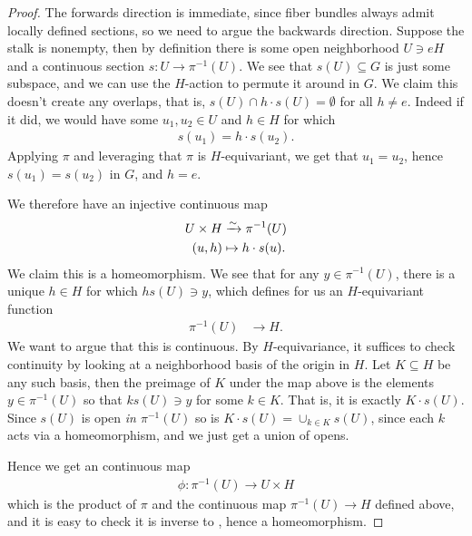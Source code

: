 \documentclass[11pt]{book}
\begin{document}
\begin{proof} The forwards direction is immediate, since fiber bundles always admit locally defined sections, so we need to argue the backwards direction. Suppose the stalk is nonempty, then by definition there is some open neighborhood $U \ni eH$ and a continuous section $s \colon U \to \pi^{-1}(U)$. We see that $s(U) \subseteq G$ is just some subspace, and we can use the $H$-action to permute it around in $G$. We claim this doesn't create any overlaps, that is, $s(U) \cap h\cdot s(U) = \emptyset$ for all $h\ne e$. Indeed if it did, we would have some $u_1,u_2\in U$ and $h\in H$ for which
\begin{align*}
    s(u_1) = h\cdot s(u_2).
\end{align*}
Applying $\pi$ and leveraging that $\pi$ is $H$-equivariant, we get that $u_1 = u_2$, hence $s(u_1) = s(u_2)$ in $G$, and $h= e$.

We therefore have an injective continuous map
\begin{equation}\label{eqn:UxH-to-piinvs-U}
\begin{aligned}
    U \times H &\xrightarrow{\sim} \pi^{-1}(U) \\
    (u,h) &\mapsto h\cdot s(u).
\end{aligned}
\end{equation}
We claim this is a homeomorphism. We see that for any $y\in \pi^{-1}(U)$, there is a unique $h\in H$ for which $hs(U) \ni y$, which defines for us an $H$-equivariant function
\begin{align*}
    \pi^{-1}(U) &\to H.
\end{align*}
We want to argue that this is continuous. By $H$-equivariance, it suffices to check continuity by looking at a neighborhood basis of the origin in $H$. Let $K \subseteq H$ be any such basis, then the preimage of $K$ under the map above is the elements $y\in \pi^{-1}(U)$ so that $ks(U) \ni y$ for some $k \in K$. That is, it is exactly $K\cdot s(U)$. Since $s(U)$ is open \emph{in $\pi^{-1}(U)$} so is $K\cdot s(U)= \cup_{k\in K}s(U)$, since each $k$ acts via a homeomorphism, and we just get a union of opens.

Hence we get an continuous map
\begin{align*}
    \phi \colon \pi^{-1}(U) \to U \times H
\end{align*}
which is the product of $\pi$ and the continuous map $\pi^{-1}(U) \to H$ defined above, and it is easy to check it is inverse to , hence a homeomorphism.


\end{proof}
\end{document}
